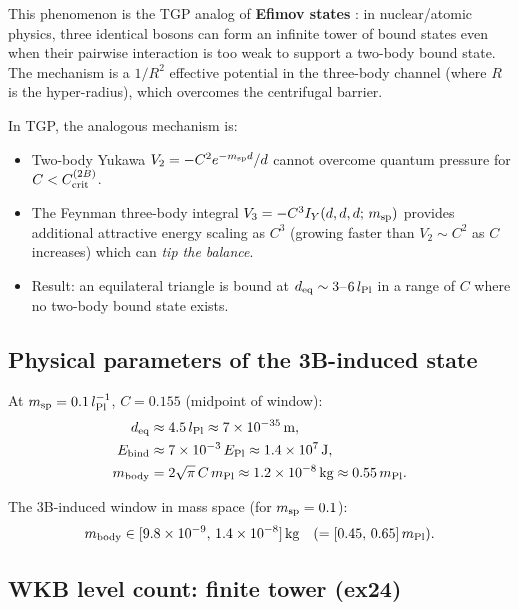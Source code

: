This phenomenon is the TGP analog of \textbf{Efimov states}
\cite{Efimov1970}: in nuclear/atomic physics, three identical bosons
can form an infinite tower of bound states even when their pairwise
interaction is too weak to support a two-body bound state.  The
mechanism is a $1/R^2$ effective potential in the three-body channel
(where $R$ is the hyper-radius), which overcomes the centrifugal barrier.

In TGP, the analogous mechanism is:
\begin{itemize}
\item Two-body Yukawa $V_2 = -C^2 e^{-m_{\rm sp}d}/d$ cannot overcome
  quantum pressure for $C < C_{\rm crit}^{(2B)}$.
\item The Feynman three-body integral $V_3 = -C^3 I_Y(d,d,d;\,m_{\rm sp})$
  provides additional attractive energy scaling as $C^3$ (growing faster
  than $V_2\sim C^2$ as $C$ increases) which can \emph{tip the balance}.
\item Result: an equilateral triangle is bound at $d_{\rm eq}\sim3$--$6\,l_{\rm Pl}$
  in a range of $C$ where no two-body bound state exists.
\end{itemize}

\subsection{Physical parameters of the 3B-induced state}

At $m_{\rm sp}=0.1\,l_{\rm Pl}^{-1}$, $C=0.155$ (midpoint of window):
\begin{align}
  d_{\rm eq} &\approx 4.5\,l_{\rm Pl} \approx 7\times10^{-35}\,\text{m}, \\
  E_{\rm bind} &\approx 7\times10^{-3}\,E_{\rm Pl} \approx 1.4\times10^7\,\text{J}, \\
  m_{\rm body} &= 2\sqrt{\pi}\,C\,m_{\rm Pl} \approx 1.2\times10^{-8}\,\text{kg}
    \approx 0.55\,m_{\rm Pl}.
\end{align}

The 3B-induced window in mass space (for $m_{\rm sp}=0.1$):
\begin{equation}
  m_{\rm body} \in [9.8\times10^{-9},\,1.4\times10^{-8}]\,\text{kg}
  \quad(= [0.45,\,0.65]\,m_{\rm Pl}).
\end{equation}

\subsection{WKB level count: finite tower (ex24)}

